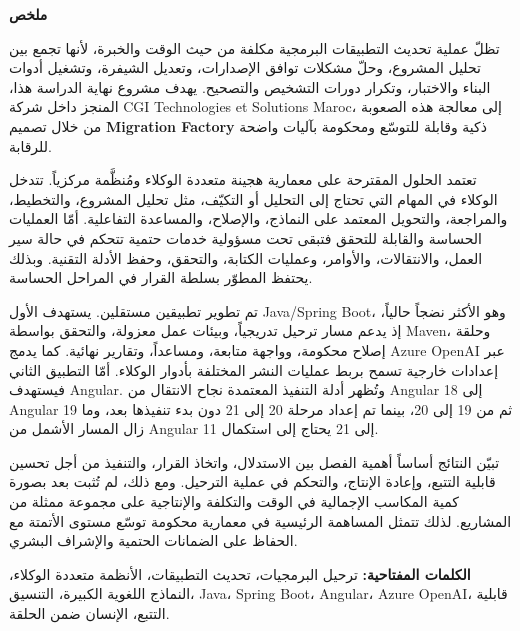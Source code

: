 \documentclass[12pt,a4paper]{article}
\begin{document}
\begin{RTL}
{\centering\fontsize{22}{28}\selectfont\bfseries ملخص\par}
\vspace{0.7cm}

تظلّ عملية تحديث التطبيقات البرمجية مكلفة من حيث الوقت والخبرة، لأنها تجمع بين تحليل المشروع، وحلّ مشكلات توافق الإصدارات، وتعديل الشيفرة، وتشغيل أدوات البناء والاختبار، وتكرار دورات التشخيص والتصحيح. يهدف مشروع نهاية الدراسة هذا، المنجز داخل شركة \textenglish{CGI Technologies et Solutions Maroc}، إلى معالجة هذه الصعوبة من خلال تصميم \textbf{Migration Factory} ذكية وقابلة للتوسّع ومحكومة بآليات واضحة للرقابة.

تعتمد الحلول المقترحة على معمارية هجينة متعددة الوكلاء ومُنظَّمة مركزياً. تتدخل الوكلاء في المهام التي تحتاج إلى التحليل أو التكيّف، مثل تحليل المشروع، والتخطيط، والمراجعة، والتحويل المعتمد على النماذج، والإصلاح، والمساعدة التفاعلية. أمّا العمليات الحساسة والقابلة للتحقق فتبقى تحت مسؤولية خدمات حتمية تتحكم في حالة سير العمل، والانتقالات، والأوامر، وعمليات الكتابة، والتحقق، وحفظ الأدلة التقنية. وبذلك يحتفظ المطوّر بسلطة القرار في المراحل الحساسة.

تم تطوير تطبيقين مستقلين. يستهدف الأول \textenglish{Java/Spring Boot}، وهو الأكثر نضجاً حالياً، إذ يدعم مسار ترحيل تدريجياً، وبيئات عمل معزولة، والتحقق بواسطة \textenglish{Maven}، وحلقة إصلاح محكومة، وواجهة متابعة، ومساعداً، وتقارير نهائية. كما يدمج \textenglish{Azure OpenAI} عبر إعدادات خارجية تسمح بربط عمليات النشر المختلفة بأدوار الوكلاء. أمّا التطبيق الثاني فيستهدف \textenglish{Angular}. وتُظهر أدلة التنفيذ المعتمدة نجاح الانتقال من \textenglish{Angular 18} إلى \textenglish{Angular 19} ثم من \textenglish{19} إلى \textenglish{20}، بينما تم إعداد مرحلة \textenglish{20} إلى \textenglish{21} دون بدء تنفيذها بعد، وما زال المسار الأشمل من \textenglish{Angular 11} إلى \textenglish{21} يحتاج إلى استكمال.

تبيّن النتائج أساساً أهمية الفصل بين الاستدلال، واتخاذ القرار، والتنفيذ من أجل تحسين قابلية التتبع، وإعادة الإنتاج، والتحكم في عملية الترحيل. ومع ذلك، لم تُثبت بعد بصورة كمية المكاسب الإجمالية في الوقت والتكلفة والإنتاجية على مجموعة ممثلة من المشاريع. لذلك تتمثل المساهمة الرئيسية في معمارية محكومة توسّع مستوى الأتمتة مع الحفاظ على الضمانات الحتمية والإشراف البشري.

\vspace{0.45cm}
\textbf{الكلمات المفتاحية:} ترحيل البرمجيات، تحديث التطبيقات، الأنظمة متعددة الوكلاء، النماذج اللغوية الكبيرة، التنسيق، \textenglish{Java}، \textenglish{Spring Boot}، \textenglish{Angular}، \textenglish{Azure OpenAI}، قابلية التتبع، الإنسان ضمن الحلقة.
\end{RTL}
\end{document}
